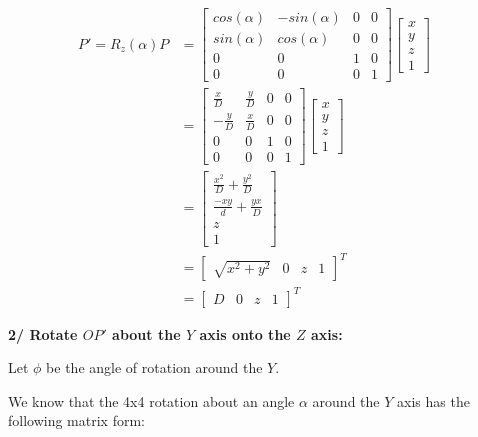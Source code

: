 \documentclass[a4paper,10pt]{article}
\begin{document}
\begin{equation}
\left.\begin{aligned}
P' = R_z(\alpha)P 
&=
\begin{bmatrix}
	cos(\alpha) & -sin(\alpha) & 0 & 0 \\
	sin(\alpha) & cos(\alpha)  & 0 & 0 \\
	0 		    & 0 		   & 1 & 0 \\
	0 			& 0 		   & 0 & 1
\end{bmatrix}
\begin{bmatrix}
x \\ y \\ z \\ 1
\end{bmatrix}&\\
&=
\begin{bmatrix}
	\frac{x}{D}  & \frac{y}{D} & 0 & 0 \\
	-\frac{y}{D} & \frac{x}{D}  & 0 & 0 \\
	0 		     & 0 		    & 1 & 0 \\
	0 			 & 0 		    & 0 & 1
\end{bmatrix}
\begin{bmatrix}
x \\ y \\ z \\ 1
\end{bmatrix}&\\
&=
\begin{bmatrix}
\frac{x^2}{D} + \frac{y^2}{D} \\
 \frac{-xy}{d} + \frac{yx}{D} \\ 
 z \\
 1
\end{bmatrix}&\\
&=
\begin{bmatrix}
\sqrt{x^2 + y^2} & 0 & z & 1
\end{bmatrix}^{T}&\\
&=
\begin{bmatrix}
D & 0 & z & 1
\end{bmatrix}^{T}&
\end{aligned}\right.
\end{equation}


\pagebreak
\noindent
\textbf{2/ Rotate $OP'$ about the $Y$ axis onto the $Z$ axis:}


\bigskip \noindent
Let $\phi$ be the angle of rotation around the $Y$.

\bigskip \noindent
We know that the 4x4 rotation about an angle $\alpha$ around the $Y$ axis has the following matrix form:
\end{document}
